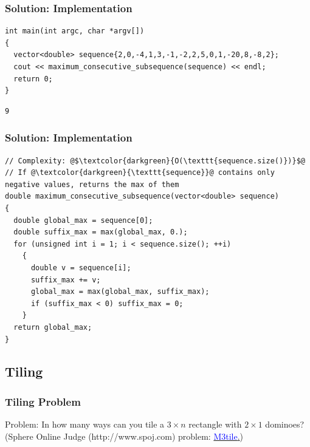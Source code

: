 \documentclass{beamer}
\newcommand{\spojlink}[2]{Sphere Online Judge (http://www.spoj.com)
  problem: \href{#2}{\textcolor{blue}{#1}.}}
\begin{document}
\begin{frame}[containsverbatim]
\frametitle{Solution: Implementation}

\scriptsize
\begin{lstlisting}
int main(int argc, char *argv[])
{
  vector<double> sequence{2,0,-4,1,3,-1,-2,2,5,0,1,-20,8,-8,2};
  cout << maximum_consecutive_subsequence(sequence) << endl;
  return 0;
}
\end{lstlisting}

\begin{verbatim}
9
\end{verbatim}

\end{frame}

\begin{frame}[containsverbatim]
\frametitle{Solution: Implementation}

\scriptsize
\begin{lstlisting}
// Complexity: @$\textcolor{darkgreen}{O(\texttt{sequence.size()})}$@
// If @\textcolor{darkgreen}{\texttt{sequence}}@ contains only negative values, returns the max of them
double maximum_consecutive_subsequence(vector<double> sequence)
{
  double global_max = sequence[0];
  double suffix_max = max(global_max, 0.);
  for (unsigned int i = 1; i < sequence.size(); ++i)
    {
      double v = sequence[i];
      suffix_max += v;
      global_max = max(global_max, suffix_max);
      if (suffix_max < 0) suffix_max = 0;
    }
  return global_max;
}
\end{lstlisting}
\end{frame}

\fi

\subsection{Tiling}

\begin{frame}%
\frametitle{Tiling Problem}

\begin{mdframed}[style=exampledefault]
Problem: In how many ways can you tile a $3\times n$ rectangle with $2\times 1$ dominoes? (\spojlink{M3tile}{http://www.spoj.com/problems/M3TILE/})
\end{mdframed}


\end{frame}
\end{document}
